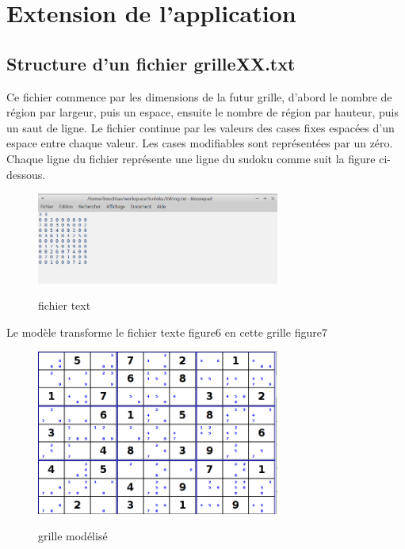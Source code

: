 \newpage
\section{Extension de l’application}
\subsection{Structure d'un fichier grilleXX.txt}
Ce fichier commence  par les dimensions de la futur grille, d’abord le nombre de région par 
largeur, puis un espace, ensuite le nombre de région par hauteur, puis un saut de ligne.
Le fichier continue par les valeurs des cases fixes espacées d’un espace entre chaque valeur. 
Les cases modifiables sont représentées par un zéro. Chaque ligne du fichier représente une 
ligne du sudoku comme suit la figure ci-dessous.
\begin{figure}[ht]
  \caption{\label{annexe1} fichier text}
  \includegraphics [width=80mm]{images/Fichier_text.png} \\[0.5cm]
\end{figure}

Le modèle transforme le fichier texte figure6 en cette grille figure7\\

\begin{figure}[ht]
  \caption{\label{annexe1} grille modélisé}
  \includegraphics [width=80mm]{images/fichier_type.png} \\[0.5cm]
\end{figure}
\newpage
